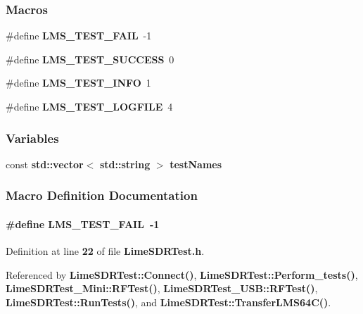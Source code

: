 \subsubsection*{Macros}
\begin{DoxyCompactItemize}
\item 
\#define {\bf L\+M\+S\+\_\+\+T\+E\+S\+T\+\_\+\+F\+A\+IL}~-\/1
\item 
\#define {\bf L\+M\+S\+\_\+\+T\+E\+S\+T\+\_\+\+S\+U\+C\+C\+E\+SS}~0
\item 
\#define {\bf L\+M\+S\+\_\+\+T\+E\+S\+T\+\_\+\+I\+N\+FO}~1
\item 
\#define {\bf L\+M\+S\+\_\+\+T\+E\+S\+T\+\_\+\+L\+O\+G\+F\+I\+LE}~4
\end{DoxyCompactItemize}
\subsubsection*{Variables}
\begin{DoxyCompactItemize}
\item 
const {\bf std\+::vector}$<$ {\bf std\+::string} $>$ {\bf test\+Names}
\end{DoxyCompactItemize}


\subsubsection{Macro Definition Documentation}
\paragraph[{L\+M\+S\+\_\+\+T\+E\+S\+T\+\_\+\+F\+A\+IL}]{\setlength{\rightskip}{0pt plus 5cm}\#define L\+M\+S\+\_\+\+T\+E\+S\+T\+\_\+\+F\+A\+IL~-\/1}\label{LimeSDRTest_8h_a343892a540db7d7fbda3de5ee689bd4d}


Definition at line {\bf 22} of file {\bf Lime\+S\+D\+R\+Test.\+h}.



Referenced by {\bf Lime\+S\+D\+R\+Test\+::\+Connect()}, {\bf Lime\+S\+D\+R\+Test\+::\+Perform\+\_\+tests()}, {\bf Lime\+S\+D\+R\+Test\+\_\+\+Mini\+::\+R\+F\+Test()}, {\bf Lime\+S\+D\+R\+Test\+\_\+\+U\+S\+B\+::\+R\+F\+Test()}, {\bf Lime\+S\+D\+R\+Test\+::\+Run\+Tests()}, and {\bf Lime\+S\+D\+R\+Test\+::\+Transfer\+L\+M\+S64\+C()}.

